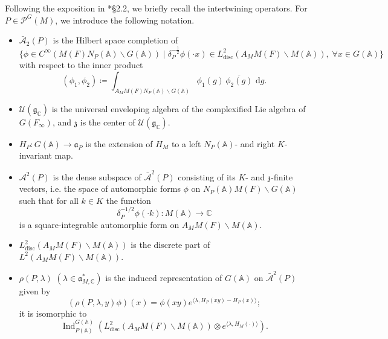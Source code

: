 \documentclass[12pt]{amsart}
\theoremstyle{definition}
\theoremstyle{plain}
\theoremstyle{remark}
\def\C{\mathbb{C}}%
\def\A{\mathbb{A}}%
\def\rd{\,\mathrm{d}}%
\def\inf{\infty}
\def\bs{\backslash}%
\DeclareMathOperator{\Ind}{Ind}%
\newcommand{\fa}{\mathfrak{a}}
\newcommand{\fg}{\mathfrak{g}}
\newcommand{\fz}{\mathfrak{z}}
\newcommand{\cA}{\mathcal{A}}
\newcommand{\cP}{\mathcal{P}}
\newcommand{\cU}{\mathcal{U}}
\numberwithin{equation}{section}
\newcommand{\disc}{\mathrm{disc}}
\begin{document}
Following the exposition in \cite{FLM11}*{\S2.2}, we briefly recall the intertwining operators.
For $P\in\cP^G(M)$, we introduce the following notation.
\begin{itemize}
    \item $\bar{\cA}_2(P)$ is the Hilbert space completion of 
    \[
    \{ \phi\in C^\inf(M(F)N_P(\A)\bs G(\A) ) \mid \delta_P^{-\frac12}\phi(\cdot x)\in L^2_{\mathrm{disc}}(A_M M(F)\bs M(\A)), \; \forall  x\in G(\A)  \}
    \]
    with respect to the inner product
    \[
    (\phi_1,\phi_2)\coloneqq \int_{A_M M(F) N_P(\A)\bs G(\A)} \phi_1(g)\, \overline{\phi_2(g)} \, \rd g .
    \]
    \item $\cU(\fg_\C)$ is the universal enveloping algebra of the complexified Lie algebra of $G(F_\inf)$, and $\fz$ is the center of $\cU(\fg_\C)$. 
    \item $H_P\colon G(\A)\to \fa_P$ is the extension of $H_M$ to a left $N_P(\A)$- and right $K$-invariant map.
    \item $\cA^2(P)$ is the dense subspace of $\bar{\cA}^2(P)$ consisting of its $K$- and $\fz$-finite vectors, i.e. the space of automorphic forms $\phi$ on $N_P(\A)M(F)\bs G(\A)$ such that for all $k\in K$ the function
    \[
    \delta_P^{-1/2}\phi(\cdot k)\colon M(\A)\to \C
    \]
    is a square-integrable automorphic form on $A_M M(F)\bs M(\A)$.
    \item $L^2_\disc(A_M M(F)\bs M(\A))$ is the discrete part of $L^2(A_M M(F)\bs M(\A))$. 
    \item $\rho(P,\lambda)$ $(\lambda\in \fa^*_{M,\C})$ is the induced representation of $G(\A)$ on $\bar{\cA}^2(P)$ given by
    \[
    (\rho(P,\lambda,y)\phi)(x)
    =
    \phi(xy)e^{\langle \lambda,H_P(xy)-H_P(x)\rangle};
    \]
    it is isomorphic to
    \[
    \Ind_{P(\A)}^{G(\A)}
    \left(
    L^2_{\disc}(A_M M(F)\bs M(\A))
    \otimes
    e^{\langle \lambda,H_M(\cdot)\rangle}
    \right).
    \]
\end{itemize}
\end{document}
